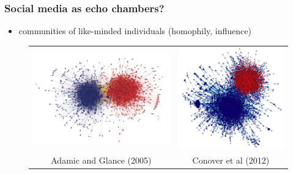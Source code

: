 \documentclass{beamer}
\begin{document}
\begin{frame}
	\frametitle{Social media as echo chambers?}
	
	\vspace{.2cm}
	\begin{itemize} 
		\item communities of like-minded individuals (homophily, influence)
	\end{itemize}
	
	\begin{figure}
		\begin{tabular}{cc}
			\hspace{-.5cm}\includegraphics[width=.40\textwidth]{figures/adamic.png} &\includegraphics[width=.40\textwidth]{figures/conover} \\
			\tiny{Adamic and Glance (2005)} & \tiny{Conover et al (2012)} \\
		\end{tabular}
	\end{figure}
	
	\vspace{.2cm}
\end{frame}
\end{document}
